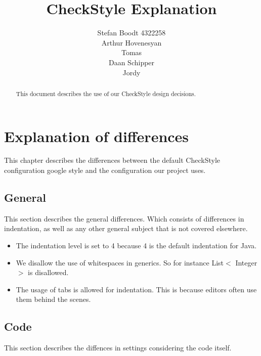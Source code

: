 \documentclass[11pt,a4paper]{report}
\title{CheckStyle Explanation}
\author{Stefan Boodt 4322258\\Arthur Hovenesyan \\Tomas\\Daan Schipper\\Jordy}
\begin{document}
\maketitle
\begin{abstract}
This document describes the use of our CheckStyle design decisions.
\end{abstract}
\tableofcontents
\newpage
\chapter{Explanation of differences}

This chapter describes the differences between the default CheckStyle configuration google style and the configuration our project uses.

\section{General}

This section describes the general differences. Which consists of differences in indentation, as well as any other general subject that is not covered elsewhere.

\begin{itemize}

\item The indentation level is set to 4 because 4 is the default indentation for Java.

\item We disallow the use of whitespaces in generics. So for instance List$<$ Integer $>$ is disallowed.

\item The usage of tabs is allowed for indentation. This is because editors often use them behind the scenes.

\end{itemize}

\section{Code}

This section describes the diffences in settings considering the code itself.
\end{document}
